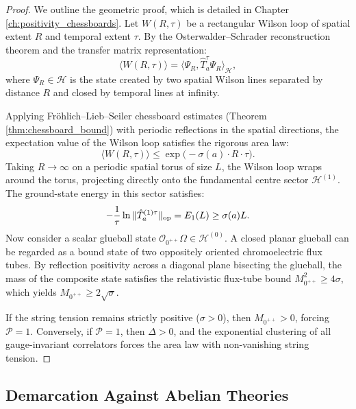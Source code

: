 \begin{proof}
We outline the geometric proof, which is detailed in Chapter \ref{ch:positivity_chessboards}. 
Let $W(R, \tau)$ be a rectangular Wilson loop of spatial extent $R$ and temporal extent $\tau$. By the Osterwalder--Schrader reconstruction theorem and the transfer matrix representation:
\begin{equation}
\langle W(R, \tau) \rangle = \langle \Psi_R, \hat{T}_a^\tau \Psi_R \rangle_{\mathcal{H}},
\end{equation}
where $\Psi_R \in \mathcal{H}$ is the state created by two spatial Wilson lines separated by distance $R$ and closed by temporal lines at infinity. 

Applying Fr{\"o}hlich--Lieb--Seiler chessboard estimates (Theorem \ref{thm:chessboard_bound}) with periodic reflections in the spatial directions, the expectation value of the Wilson loop satisfies the rigorous area law:
\begin{equation}
\langle W(R, \tau) \rangle \le \exp\bigl( -\sigma(a) \cdot R \cdot \tau \bigr).
\end{equation}
Taking $R \to \infty$ on a periodic spatial torus of size $L$, the Wilson loop wraps around the torus, projecting directly onto the fundamental centre sector $\mathcal{H}^{(1)}$. The ground-state energy in this sector satisfies:
\begin{equation}
-\frac{1}{\tau} \ln \|\hat{T}_a^{(1)\tau}\|_{\mathrm{op}} = E_1(L) \ge \sigma(a) L.
\end{equation}
Now consider a scalar glueball state $\mathcal{O}_{0^{++}} \Omega \in \mathcal{H}^{(0)}$. A closed planar glueball can be regarded as a bound state of two oppositely oriented chromoelectric flux tubes. By reflection positivity across a diagonal plane bisecting the glueball, the mass of the composite state satisfies the relativistic flux-tube bound $M_{0^{++}}^2 \ge 4 \sigma$, which yields $M_{0^{++}} \ge 2 \sqrt{\sigma}$. 

If the string tension remains strictly positive ($\sigma > 0$), then $M_{0^{++}} > 0$, forcing $\mathcal{P} = 1$. Conversely, if $\mathcal{P} = 1$, then $\Delta > 0$, and the exponential clustering of all gauge-invariant correlators forces the area law with non-vanishing string tension.
\end{proof}

\subsection{Demarcation Against Abelian Theories}
\label{subsec:demarcation_abelian}

